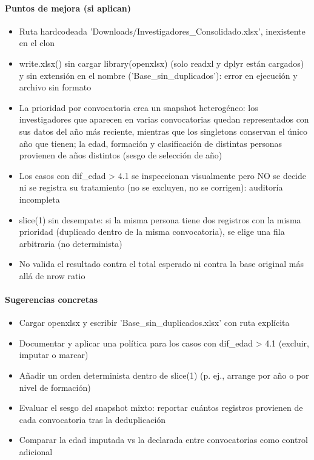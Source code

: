 \paragraph{Puntos de mejora (si aplican)}
\begin{itemize}
  \item Ruta hardcodeada 'Downloads/Investigadores\_Consolidado.xlsx', inexistente en el clon
  \item write.xlsx() sin cargar library(openxlsx) (solo readxl y dplyr están cargados) y sin extensión en el nombre ('Base\_sin\_duplicados'): error en ejecución y archivo sin formato
  \item La prioridad por convocatoria crea un snapshot heterogéneo: los investigadores que aparecen en varias convocatorias quedan representados con sus datos del año más reciente, mientras que los singletons conservan el único año que tienen; la edad, formación y clasificación de distintas personas provienen de años distintos (sesgo de selección de año)
  \item Los casos con dif\_edad > 4.1 se inspeccionan visualmente pero NO se decide ni se registra su tratamiento (no se excluyen, no se corrigen): auditoría incompleta
  \item slice(1) sin desempate: si la misma persona tiene dos registros con la misma prioridad (duplicado dentro de la misma convocatoria), se elige una fila arbitraria (no determinista)
  \item No valida el resultado contra el total esperado ni contra la base original más allá de nrow ratio
\end{itemize}

\paragraph{Sugerencias concretas}
\begin{itemize}
  \item Cargar openxlsx y escribir 'Base\_sin\_duplicados.xlsx' con ruta explícita
  \item Documentar y aplicar una política para los casos con dif\_edad > 4.1 (excluir, imputar o marcar)
  \item Añadir un orden determinista dentro de slice(1) (p. ej., arrange por año o por nivel de formación)
  \item Evaluar el sesgo del snapshot mixto: reportar cuántos registros provienen de cada convocatoria tras la deduplicación
  \item Comparar la edad imputada vs la declarada entre convocatorias como control adicional
\end{itemize}

